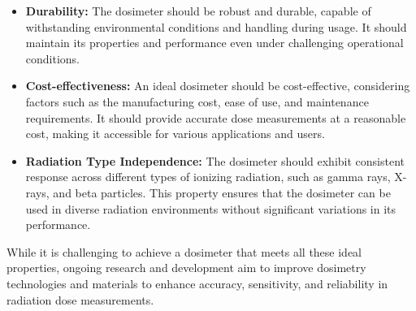 \documentclass[../introduction.tex]{subfiles}
\begin{document}
\begin{itemize}
            \item \textbf{Durability: } The dosimeter should be robust and durable, capable of withstanding 
            environmental conditions and handling during usage. It should maintain its properties and 
            performance even under challenging operational conditions.

            \item \textbf{Cost-effectiveness: } An ideal dosimeter should be cost-effective, considering 
            factors such as the manufacturing cost, ease of use, and maintenance requirements. It should 
            provide accurate dose measurements at a reasonable cost, making it accessible for various 
            applications and users.

            \item \textbf{Radiation Type Independence: } The dosimeter should exhibit consistent response 
            across different types of ionizing radiation, such as gamma rays, X-rays, and beta particles. 
            This property ensures that the dosimeter can be used in diverse radiation environments without 
            significant variations in its performance.

        \end{itemize}

        While it is challenging to achieve a dosimeter that meets all these ideal properties, ongoing 
        research and development aim to improve dosimetry technologies and materials to enhance accuracy, 
        sensitivity, and reliability in radiation dose measurements.
    
\end{document}

